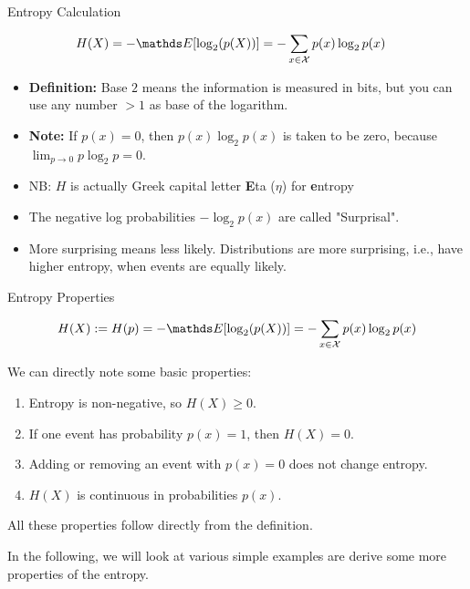 \documentclass[11pt,compress,t,notes=noshow, xcolor=table]{beamer}
\begin{document}
\begin{vbframe}{Entropy Calculation}


\begin{equation*}
\begin{aligned} 
  H(X) = - \E[\log_2(p(X))]           &= -\sum_{x \in \Xspace} p(x) \log_2 p(x) 
\end{aligned} 
\end{equation*}
\begin{itemize}
\setlength\itemsep{1.2em} 
\item \textbf{Definition:}
Base $2$ means the information is measured in bits, but you can use any number $>1$ as base of the logarithm.
\item \textbf{Note:} If $p(x) = 0$, then $p(x) \log_2 p(x)$ is taken to be zero, because $\lim _{p \rightarrow 0} p \log_2 p=0$. %
\item NB: $H$ is actually Greek capital letter \textbf{E}ta ($\eta$) for \textbf{e}ntropy
\item The negative log probabilities $-\log_2 p(x)$ are called "Surprisal".
\item More surprising means less likely. Distributions are more surprising, i.e., have higher entropy, when events are equally likely.
\end{itemize}



\end{vbframe}

\begin{vbframe}{Entropy Properties}

$$H(X) := H(p) = - \E[\log_2(p(X))] = -\sum_{x \in \Xspace} p(x) \log_2 p(x)$$

We can directly note some basic properties:
\vspace{0.2cm}
  \begin{enumerate}
  \setlength\itemsep{1.2em} 
    \item Entropy is non-negative, so $H(X) \geq 0$.
    \item If one event has probability $p(x) = 1$, then $H(X)=0$. 
    \item Adding or removing an event with $p(x)=0$ does not change entropy.
    \item $H(X)$ is continuous in probabilities $p(x)$.
  \end{enumerate}
\vspace{0.2cm}  
All these properties follow directly from the definition.

\vspace{0.2cm}

In the following, we will look at various simple examples are derive some more properties of the entropy.

\end{vbframe}
\end{document}
